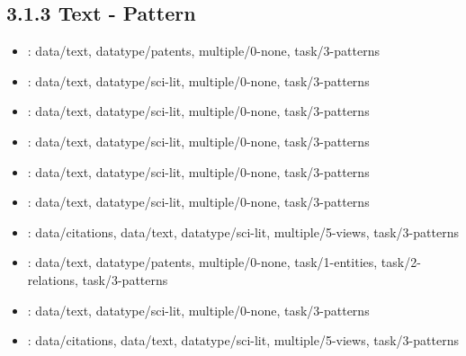 \begin {refsection}
\section [3.1.3 Text - Pattern] {3.1.3 Text - Pattern}

\begin {itemize}
\item \cite {oesterling-2010-two-stage-framework-for-a-topology-based-projection-and-visualization}:
    data/text, datatype/patents, multiple/0-none, task/3-patterns


\item \cite {gretarsson-2012-topicnets:-visual-analysis-of-large-text}:
    data/text, datatype/sci-lit, multiple/0-none, task/3-patterns


\item \cite {wu-2011-semantic-preserving-word-clouds-by-seam-carving}:
    data/text, datatype/sci-lit, multiple/0-none, task/3-patterns


\item \cite {skupin-2004-the-world-of-geography:-visualizing-a-knowledge-domain}:
    data/text, datatype/sci-lit, multiple/0-none, task/3-patterns


\item \cite {choo-2013-utopian:-user-driven-topic-modeling-based}:
    data/text, datatype/sci-lit, multiple/0-none, task/3-patterns


\item \cite {jiang-2016-a-text-visualization-method-for-cross-domain-research}:
    data/text, datatype/sci-lit, multiple/0-none, task/3-patterns


\item \cite {chuang-2012-large-scale-examination-of-academic-publications-using}:
    data/citations, data/text, datatype/sci-lit, multiple/5-views, task/3-patterns


\item \cite {decamp-2005-gist-icons:-seeing-meaning-in-large}:
    data/text, datatype/patents, multiple/0-none, task/1-entities, task/2-relations, task/3-patterns


\item \cite {skupin-2002-a-cartographic-approach-to-visualizing-conference-abstracts}:
    data/text, datatype/sci-lit, multiple/0-none, task/3-patterns


\item \cite {davidson-1998-knowledge-mining-with-vxinsight:-discovery}:
    data/citations, data/text, datatype/sci-lit, multiple/5-views, task/3-patterns



\end{itemize}
\end{refsection}
